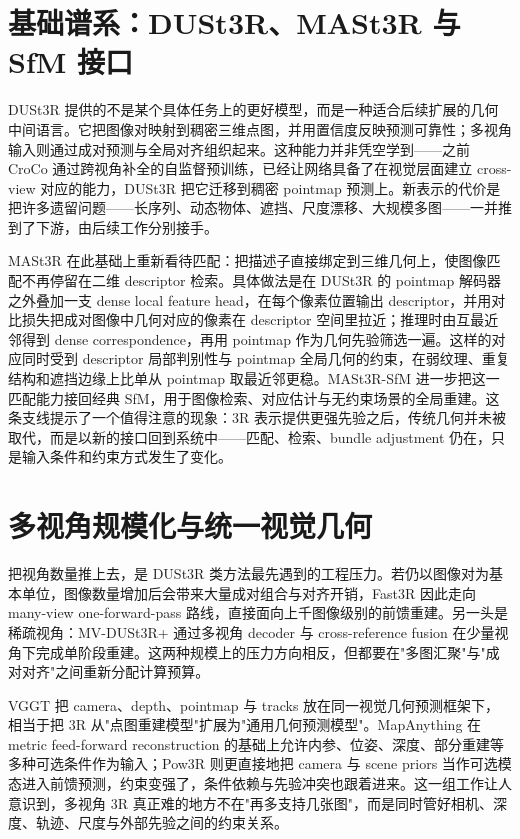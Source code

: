 \documentclass[UTF8,a4paper,zihao=-4,fontset=windows]{ctexart}
\begin{document}
\section{基础谱系：DUSt3R、MASt3R 与 SfM 接口}

DUSt3R 提供的不是某个具体任务上的更好模型，而是一种适合后续扩展的几何中间语言。它把图像对映射到稠密三维点图，并用置信度反映预测可靠性；多视角输入则通过成对预测与全局对齐组织起来\citep{dust3r}。这种能力并非凭空学到——之前 CroCo 通过跨视角补全的自监督预训练，已经让网络具备了在视觉层面建立 cross-view 对应的能力，DUSt3R 把它迁移到稠密 pointmap 预测上\citep{croco}。新表示的代价是把许多遗留问题——长序列、动态物体、遮挡、尺度漂移、大规模多图——一并推到了下游，由后续工作分别接手。

MASt3R 在此基础上重新看待匹配：把描述子直接绑定到三维几何上，使图像匹配不再停留在二维 descriptor 检索\citep{mast3r}。具体做法是在 DUSt3R 的 pointmap 解码器之外叠加一支 dense local feature head，在每个像素位置输出 descriptor，并用对比损失把成对图像中几何对应的像素在 descriptor 空间里拉近；推理时由互最近邻得到 dense correspondence，再用 pointmap 作为几何先验筛选一遍。这样的对应同时受到 descriptor 局部判别性与 pointmap 全局几何的约束，在弱纹理、重复结构和遮挡边缘上比单从 pointmap 取最近邻更稳。MASt3R-SfM 进一步把这一匹配能力接回经典 SfM，用于图像检索、对应估计与无约束场景的全局重建\citep{mast3r_sfm}。这条支线提示了一个值得注意的现象：3R 表示提供更强先验之后，传统几何并未被取代，而是以新的接口回到系统中——匹配、检索、bundle adjustment 仍在，只是输入条件和约束方式发生了变化。

\section{多视角规模化与统一视觉几何}

把视角数量推上去，是 DUSt3R 类方法最先遇到的工程压力。若仍以图像对为基本单位，图像数量增加后会带来大量成对组合与对齐开销，Fast3R 因此走向 many-view one-forward-pass 路线，直接面向上千图像级别的前馈重建\citep{fast3r}。另一头是稀疏视角：MV-DUSt3R+ 通过多视角 decoder 与 cross-reference fusion 在少量视角下完成单阶段重建\citep{mvdust3rplus}。这两种规模上的压力方向相反，但都要在"多图汇聚"与"成对对齐"之间重新分配计算预算。

VGGT 把 camera、depth、pointmap 与 tracks 放在同一视觉几何预测框架下，相当于把 3R 从"点图重建模型"扩展为"通用几何预测模型"\citep{vggt}。MapAnything 在 metric feed-forward reconstruction 的基础上允许内参、位姿、深度、部分重建等多种可选条件作为输入\citep{mapanything}；Pow3R 则更直接地把 camera 与 scene priors 当作可选模态进入前馈预测，约束变强了，条件依赖与先验冲突也跟着进来\citep{pow3r}。这一组工作让人意识到，多视角 3R 真正难的地方不在"再多支持几张图"，而是同时管好相机、深度、轨迹、尺度与外部先验之间的约束关系。
\end{document}
